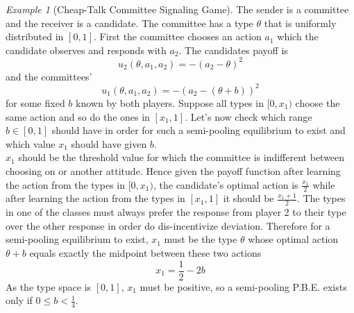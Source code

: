 \documentclass[a4paper, 12pt]{article}
\theoremstyle{plain}
\theoremstyle{definition}
\theoremstyle{lemma}
\theoremstyle{remark}
\theoremstyle{corollary}
\theoremstyle{example}
\newtheorem{example}[theorem]{Example}
\begin{document}
	\begin{example}[Cheap-Talk Committee Signaling Game]
		The sender is a committee and the receiver is a candidate. The committee has a type $\theta$ that is uniformly distributed in $[0,1]$. First the committee chooses an action $a_1$ which the candidate observes and responds with $a_2$. The candidates payoff is \[u_2(\theta,a_1,a_2) = -(a_2-\theta)^2\] and the committees' \[u_1(\theta,a_1,a_2) = -(a_2-(\theta+b))^2\] for some fixed $b$ known by both players. Suppose all types in $[0,x_1)$ choose the same action and so do the ones in $[x_1,1]$. Let's now check which range $b \in [0,1]$ should have in order for such a semi-pooling equilibrium to exist and which value $x_1$ should have given $b$.\\
		$x_1$ should be the threshold value for which the committee is indifferent between choosing on or another attitude. Hence given the payoff function after learning the action from the types in $[0,x_1)$, the candidate's optimal action is $\frac{x_1}{2}$ while after learning the action from the types in $[x_1,1]$ it should be $\frac{x_1+1}{2}$. The types in one of the classes must always prefer the response from player 2 to their type over the other response in order do dis-incentivize deviation. Therefore for a semi-pooling equilibrium to exist, $x_1$ must be the type $\theta$ whose optimal action $\theta+b$ equals exactly the midpoint between these two actions \[x_1 = \frac{1}{2}-2b\] As the type space is $[0,1]$, $x_1$ must be positive, so a semi-pooling P.B.E. exists only if $0\leq b < \frac{1}{4}$.
	\end{example}
\end{document}
